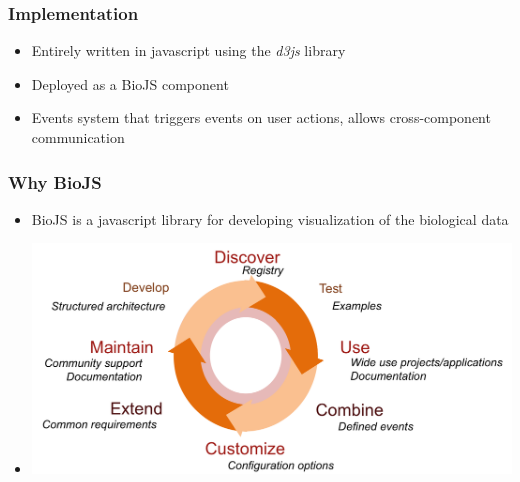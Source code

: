 \documentclass[10pt, compress]{beamer}
\renewcommand{\(}{\begin{columns}}
\renewcommand{\)}{\end{columns}}
\newcommand{\<}[1]{\begin{column}{#1}}
\renewcommand{\>}{\end{column}}
\begin{document}
\begin{frame}
\frametitle{Implementation}
\begin{itemize}[<+- | alert@+>]
\item Entirely written in javascript using the \textit{d3js} library
\item Deployed as a BioJS component
\item Events system that triggers events on user actions, allows cross-component communication

 \end{itemize}
\end{frame}

\begin{frame}
\frametitle{Why BioJS}
\begin{itemize}[<+- | alert@+>]
\item BioJS is a javascript library for developing visualization of the biological data
\item 
\includegraphics[width=\linewidth]{images/cycle}

\end{itemize}
\end{frame}
\end{document}
